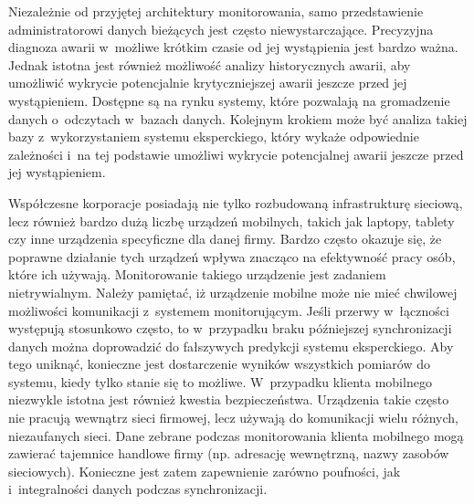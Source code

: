 Niezależnie od przyjętej architektury monitorowania, samo
przedstawienie administratorowi danych bieżących jest często
niewystarczające. Precyzyjna diagnoza awarii w~możliwe krótkim czasie od
jej wystąpienia jest bardzo ważna. Jednak istotna jest również
możliwość analizy historycznych awarii, aby umożliwić wykrycie
potencjalnie krytyczniejszej awarii jeszcze przed jej
wystąpieniem. Dostępne są na rynku systemy, które pozwalają na
gromadzenie danych o~odczytach w~bazach danych. Kolejnym krokiem może
być analiza takiej bazy z~wykorzystaniem systemu eksperckiego,
który wykaże odpowiednie zależności i~na tej podstawie umożliwi
wykrycie potencjalnej awarii jeszcze przed jej wystąpieniem.

Współczesne korporacje posiadają nie tylko rozbudowaną infrastrukturę
sieciową, lecz również bardzo dużą liczbę urządzeń mobilnych, takich
jak laptopy, tablety czy inne urządzenia specyficzne dla danej
firmy. Bardzo często okazuje się, że poprawne działanie tych urządzeń
wpływa znacząco na efektywność pracy osób, które ich
używają. Monitorowanie takiego urządzenie jest zadaniem
nietrywialnym. Należy pamiętać, iż urządzenie mobilne może nie mieć
chwilowej możliwości komunikacji z~systemem monitorującym. Jeśli
przerwy w~łączności występują stosunkowo często, to w~przypadku braku
późniejszej synchronizacji danych można doprowadzić do fałszywych
predykcji systemu eksperckiego. Aby tego uniknąć, konieczne jest
dostarczenie wyników wszystkich pomiarów do systemu, kiedy tylko
stanie się to możliwe. W~przypadku klienta mobilnego niezwykle istotna
jest również kwestia bezpieczeństwa. Urządzenia takie często nie
pracują wewnątrz sieci firmowej, lecz używają do komunikacji wielu
różnych, niezaufanych sieci. Dane zebrane podczas monitorowania
klienta mobilnego mogą zawierać tajemnice handlowe firmy
(np. adresację wewnętrzną, nazwy zasobów sieciowych). Konieczne jest
zatem zapewnienie zarówno poufności, jak i~integralności danych podczas
synchronizacji.


